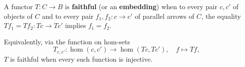 A functor $T: C \rightarrow B$ is \textbf{faithful} (or an \textbf{embedding}) when to every pair $c, c'$ of objects of $C$ and to every pair $f_1, f_2: c \rightarrow c'$ of parallel arrows of $C$, the equality $Tf_1 = Tf_2: Tc \rightarrow Tc'$ implies $f_1 = f_2$.

Equivalently, via the function on hom-sets
$$T_{c, c'}: \hom(c, c') \rightarrow \hom(Tc, Tc'), \quad f \mapsto Tf,$$
$T$ is faithful when every such function is injective.
